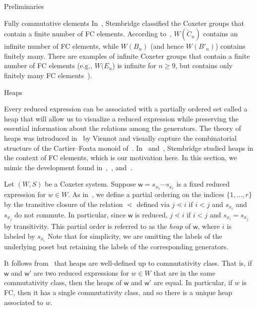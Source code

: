 \documentclass[11pt]{amsart}
\theoremstyle{definition}
\numberwithin{equation}{section}
\newcommand{\C}{\widetilde{C}}
\renewcommand{\(}{\left(}
\renewcommand{\)}{\right)}
\newcommand{\w}{\mathsf{w}}
\begin{document}
\begin{section}{Preliminaries}
\begin{subsection}{Fully commutative elements}
In~\cite{Stembridge1996}, Stembridge classified the Coxeter groups that contain a finite number of FC elements.  According to~\cite[Theorem 5.1]{Stembridge1996}, $W(\C_{n})$ contains an infinite number of FC elements, while $W(B_{n})$ (and hence $W(B'_n)$) contains finitely many.  There are examples of infinite Coxeter groups that contain a finite number of FC elements (e.g., $W(E_n$) is infinite for $n\geq 9$, but contains only finitely many FC elements~\cite[Theorem 5.1]{Stembridge1996}).

\end{subsection}


\begin{subsection}{Heaps}\label{subsec:heaps}

Every reduced expression can be associated with a partially ordered set called a heap that will allow us to visualize a reduced expression  while preserving the essential information about the relations among the generators.  The theory of heaps was introduced in~\cite{Viennot1986} by Viennot and visually capture the combinatorial structure of the Cartier--Foata monoid of~\cite{Cartier1969}.  In~\cite{Stembridge1996} and~\cite{Stembridge1998}, Stembridge studied heaps in the context of FC elements, which is our motivation here.  In this section, we mimic the development found in~\cite{Billey2007},~\cite{Ernst2010}, and~\cite{Stembridge1996}.

Let $(W,S)$ be a Coxeter system.  Suppose $\w = s_{x_1} \cdots s_{x_r}$ is a fixed reduced expression for $w \in W$.  As in~\cite{Stembridge1996}, we define a partial ordering on the indices $\{1, \dots, r\}$ by the transitive closure of the relation $\lessdot$ defined via $j \lessdot i$ if $i < j$ and $s_{x_i}$ and $s_{x_j}$ do not commute.  In particular, since $\w$ is reduced, $j \lessdot i$ if $i < j$ and $s_{x_i} = s_{x_j}$ by transitivity.  This partial order is referred to as the \emph{heap} of $\w$, where $i$ is labeled by $s_{x_i}$  Note that for simplicity, we are omitting the labels of the underlying poset but retaining the labels of the corresponding generators.

It follows from~\cite[Proposition 2.2]{Stembridge1996} that heaps are well-defined up to commutativity class.  That is, if $\w$ and $\w'$ are two reduced expressions for $w \in W$ that are in the same commutativity class, then the heaps of $\w$ and $\w'$ are equal.  In particular, if $w$ is FC, then it has a single commutativity class, and so there is a unique heap associated to $w$.


\end{subsection}
\end{section}
\end{document}
